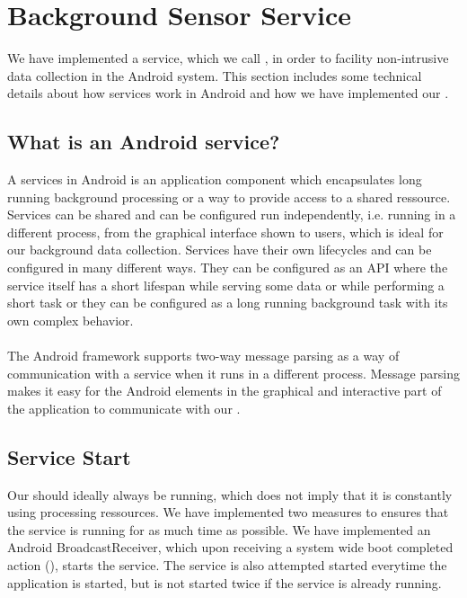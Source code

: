 
\section{Background Sensor Service}
\label{sec:background_sensor_service}
We have implemented a service, which we call , in order to facility non-intrusive data collection in the Android system.
This section includes some technical details about how services work in Android and how we have implemented our . 

\subsection{What is an Android service?}
A services in Android is an application component which encapsulates long running background processing or a way to provide access to a shared ressource. Services can be shared and can be configured run independently, i.e. running in a different process, from the graphical interface shown to users, which is ideal for our background data collection. Services have their own lifecycles and can be configured in many different ways. They can be configured as an API where the service itself has a short lifespan while serving some data or while performing a short task or they can be configured as a long running background task with its own complex behavior.
\\\\
The Android framework supports two-way message parsing as a way of communication with a service when it runs in a different process. Message parsing makes it easy for the Android  elements in the graphical and interactive part of the application to communicate with our .

\subsection{Service Start}
Our  should ideally always be running, which does not imply that it is constantly using processing ressources. We have implemented two measures to ensures that the service is running for as much time as possible. We have implemented an Android BroadcastReceiver, which upon receiving a system wide boot completed action (), starts the service. The service is also attempted started everytime the application is started, but is not started twice if the service is already running. 

